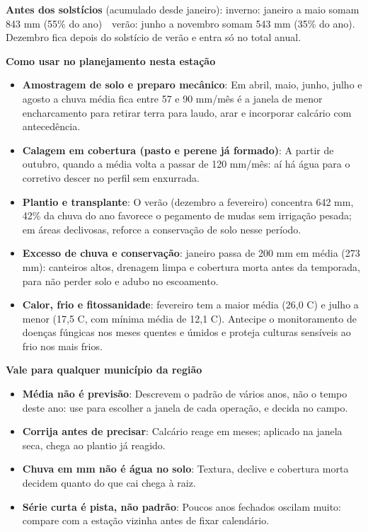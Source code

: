 \documentclass[10pt,a4paper]{article}
\begin{document}
\vspace{1pt}
{\footnotesize\textbf{Antes dos solstícios} (acumulado desde janeiro):
inverno: janeiro a maio somam 843 mm (55\% do ano) \,\textbullet\, verão: junho a novembro somam 543 mm (35\% do ano). Dezembro fica depois do solstício de verão e entra só no total
anual.}

\vspace{2pt}
{\bfseries\small Como usar no planejamento nesta estação}

\footnotesize\begin{itemize}\setlength{\itemsep}{0.5pt}
  \item \textbf{Amostragem de solo e preparo mecânico}: Em abril, maio, junho, julho e agosto a chuva média fica entre 57 e 90 mm/mês \textemdash{} é a janela de menor encharcamento para retirar terra para laudo, arar e incorporar calcário com antecedência.
  \item \textbf{Calagem em cobertura (pasto e perene já formado)}: A partir de outubro, quando a média volta a passar de 120 mm/mês: aí há água para o corretivo descer no perfil sem enxurrada.
  \item \textbf{Plantio e transplante}: O verão (dezembro a fevereiro) concentra 642 mm, 42\% da chuva do ano \textemdash{} favorece o pegamento de mudas sem irrigação pesada; em áreas declivosas, reforce a conservação de solo nesse período.
  \item \textbf{Excesso de chuva e conservação}: janeiro passa de 200 mm em média (273 mm): canteiros altos, drenagem limpa e cobertura morta antes da temporada, para não perder solo e adubo no escoamento.
  \item \textbf{Calor, frio e fitossanidade}: fevereiro tem a maior média (26,0 \textdegree{}C) e julho a menor (17,5 \textdegree{}C, com mínima média de 12,1 \textdegree{}C). Antecipe o monitoramento de doenças fúngicas nos meses quentes e úmidos e proteja culturas sensíveis ao frio nos mais frios.
\end{itemize}

\vspace{1pt}
{\bfseries\small Vale para qualquer município da região}

\scriptsize\begin{itemize}\setlength{\itemsep}{0.5pt}
  \item \textbf{Média não é previsão}: Descrevem o padrão de vários anos, não o tempo deste ano: use para escolher a janela de cada operação, e decida no campo.
  \item \textbf{Corrija antes de precisar}: Calcário reage em meses; aplicado na janela seca, chega ao plantio já reagido.
  \item \textbf{Chuva em mm não é água no solo}: Textura, declive e cobertura morta decidem quanto do que cai chega à raiz.
  \item \textbf{Série curta é pista, não padrão}: Poucos anos fechados oscilam muito: compare com a estação vizinha antes de fixar calendário.
\end{itemize}
\end{document}
